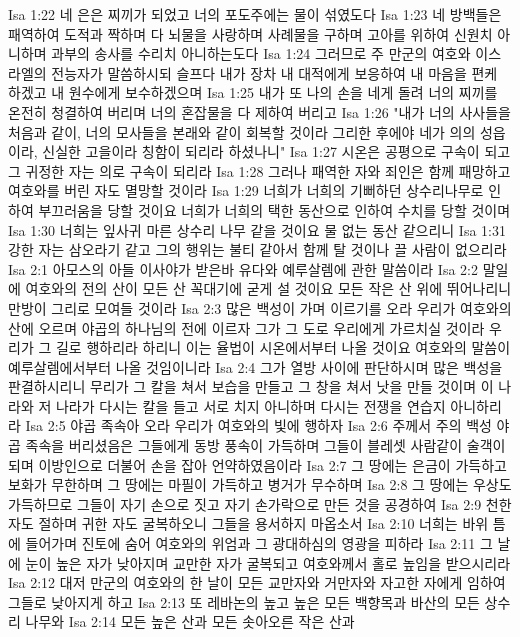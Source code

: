Isa 1:22  네 은은 찌끼가 되었고 너의 포도주에는 물이 섞였도다
Isa 1:23  네 방백들은 패역하여 도적과 짝하며 다 뇌물을 사랑하며 사례물을 구하며 고아를 위하여 신원치 아니하며 과부의 송사를 수리치 아니하는도다
Isa 1:24  그러므로 주 만군의 여호와 이스라엘의 전능자가 말씀하시되 슬프다 내가 장차 내 대적에게 보응하여 내 마음을 편케 하겠고 내 원수에게 보수하겠으며
Isa 1:25  내가 또 나의 손을 네게 돌려 너의 찌끼를 온전히 청결하여 버리며 너의 혼잡물을 다 제하여 버리고
Isa 1:26  "내가 너의 사사들을 처음과 같이, 너의 모사들을 본래와 같이 회복할 것이라 그리한 후에야 네가 의의 성읍이라, 신실한 고을이라 칭함이 되리라 하셨나니"
Isa 1:27  시온은 공평으로 구속이 되고 그 귀정한 자는 의로 구속이 되리라
Isa 1:28  그러나 패역한 자와 죄인은 함께 패망하고 여호와를 버린 자도 멸망할 것이라
Isa 1:29  너희가 너희의 기뻐하던 상수리나무로 인하여 부끄러움을 당할 것이요 너희가 너희의 택한 동산으로 인하여 수치를 당할 것이며
Isa 1:30  너희는 잎사귀 마른 상수리 나무 같을 것이요 물 없는 동산 같으리니
Isa 1:31  강한 자는 삼오라기 같고 그의 행위는 불티 같아서 함께 탈 것이나 끌 사람이 없으리라
Isa 2:1  아모스의 아들 이사야가 받은바 유다와 예루살렘에 관한 말씀이라
Isa 2:2  말일에 여호와의 전의 산이 모든 산 꼭대기에 굳게 설 것이요 모든 작은 산 위에 뛰어나리니 만방이 그리로 모여들 것이라
Isa 2:3  많은 백성이 가며 이르기를 오라 우리가 여호와의 산에 오르며 야곱의 하나님의 전에 이르자 그가 그 도로 우리에게 가르치실 것이라 우리가 그 길로 행하리라 하리니 이는 율법이 시온에서부터 나올 것이요 여호와의 말씀이 예루살렘에서부터 나올 것임이니라
Isa 2:4  그가 열방 사이에 판단하시며 많은 백성을 판결하시리니 무리가 그 칼을 쳐서 보습을 만들고 그 창을 쳐서 낫을 만들 것이며 이 나라와 저 나라가 다시는 칼을 들고 서로 치지 아니하며 다시는 전쟁을 연습지 아니하리라
Isa 2:5  야곱 족속아 오라 우리가 여호와의 빛에 행하자
Isa 2:6  주께서 주의 백성 야곱 족속을 버리셨음은 그들에게 동방 풍속이 가득하며 그들이 블레셋 사람같이 술객이 되며 이방인으로 더불어 손을 잡아 언약하였음이라
Isa 2:7  그 땅에는 은금이 가득하고 보화가 무한하며 그 땅에는 마필이 가득하고 병거가 무수하며
Isa 2:8  그 땅에는 우상도 가득하므로 그들이 자기 손으로 짓고 자기 손가락으로 만든 것을 공경하여
Isa 2:9  천한 자도 절하며 귀한 자도 굴복하오니 그들을 용서하지 마옵소서
Isa 2:10  너희는 바위 틈에 들어가며 진토에 숨어 여호와의 위엄과 그 광대하심의 영광을 피하라
Isa 2:11  그 날에 눈이 높은 자가 낮아지며 교만한 자가 굴복되고 여호와께서 홀로 높임을 받으시리라
Isa 2:12  대저 만군의 여호와의 한 날이 모든 교만자와 거만자와 자고한 자에게 임하여 그들로 낮아지게 하고
Isa 2:13  또 레바논의 높고 높은 모든 백향목과 바산의 모든 상수리 나무와
Isa 2:14  모든 높은 산과 모든 솟아오른 작은 산과
